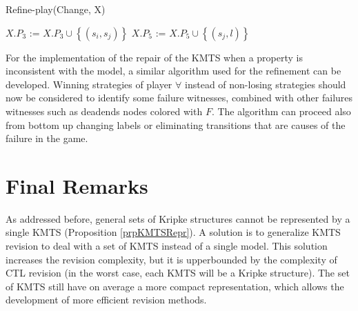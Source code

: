 \documentclass{llncs}
\begin{document}
\begin{algorithm}[h!]
\caption{Refine-play(Change, X)}
\label{algRefPlay}
	\BlankLine
	 {
		$X.P_{3}$ := $X.P_{3} \cup \left\{(s_{i},s_{j})\right\}$\;
	}
	 {
		$X.P_{5}$ := $X.P_{5} \cup \left\{(s_{j},l)\right\}$\;
	}
\end{algorithm}

For the implementation of the repair of the KMTS when a property is inconsistent with the model, a similar algorithm used for the refinement can be developed. Winning strategies of player $\forall$ instead of non-losing strategies should now be considered to identify some failure witnesses, combined with other failures witnesses such as deadends nodes colored with $F$. The algorithm can proceed also from bottom up changing labels or eliminating transitions that are causes of the failure in the game. 

\section{Final Remarks}
\label{secFinRem}
As addressed before, general sets of Kripke structures cannot be represented by a single KMTS (Proposition \ref{prpKMTSRepr}). A solution is to generalize KMTS revision to deal with a set of KMTS instead of a single model. This solution increases the revision complexity, but it is upperbounded by the complexity of CTL revision (in the worst case, each KMTS will be a Kripke structure). The set of KMTS still have on average a more compact representation, which allows the development of more efficient revision methods.
 
\end{document}
